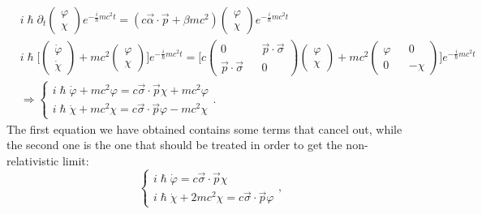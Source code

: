 \begin{align*}
    &i\hslash\partial_t\begin{pmatrix}
        \varphi\\\chi
    \end{pmatrix}e^{-\frac{i}{\hslash}mc^2t}=(c\vec\alpha\cdot\vec p+\beta mc^2)\begin{pmatrix}
        \varphi\\\chi
    \end{pmatrix}e^{-\frac{i}{\hslash}mc^2t}\\
    &i\hslash\bigg[\begin{pmatrix}
        \dot\varphi\\\dot\chi
    \end{pmatrix}+mc^2
        \begin{pmatrix}
            \varphi\\\chi
        \end{pmatrix}\bigg]e^{-\frac{i}{\hslash}mc^2t}
        =\bigg[c
        \begin{pmatrix}
            0&&\vec p\cdot\vec\sigma\\
            \vec p\cdot\vec\sigma&&0
        \end{pmatrix}
        \begin{pmatrix}
            \varphi\\\chi
        \end{pmatrix}+mc^2
        \begin{pmatrix}
            \varphi&&0\\0&&-\chi
        \end{pmatrix}
        \bigg]e^{-\frac{i}{\hslash}mc^2t}
        \\&\Rightarrow\begin{cases}
            i\hslash\dot\varphi+mc^2\varphi=c\vec\sigma\cdot\vec p\chi+mc^2\varphi\\
            i\hslash\dot\chi+mc^2\chi=c\vec\sigma\cdot\vec p\varphi-mc^2\chi
        \end{cases}.
\end{align*}
The first equation we have obtained contains some terms that cancel out, while the second one is the one that should be treated in order to get the non-relativistic limit:
\begin{equation*}
    \begin{cases}
        i\hslash\dot\varphi=c\vec\sigma\cdot\vec p\chi\\
        i\hslash\dot\chi+2mc^2\chi=c\vec\sigma\cdot\vec p\varphi
    \end{cases},
\end{equation*}
